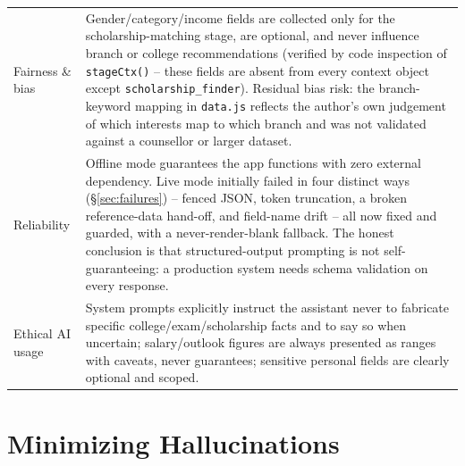 \documentclass[11pt]{article}
\begin{document}
\begin{longtable}{|p{2.6cm}|p{11cm}|}
Fairness \& bias & Gender/category/income fields are collected only for the scholarship-matching stage, are optional, and never influence branch or college recommendations (verified by code inspection of \texttt{stageCtx()} -- these fields are absent from every context object except \texttt{scholarship\_finder}). Residual bias risk: the branch-keyword mapping in \texttt{data.js} reflects the author's own judgement of which interests map to which branch and was not validated against a counsellor or larger dataset. \\
Reliability & Offline mode guarantees the app functions with zero external dependency. Live mode initially failed in four distinct ways (\S\ref{sec:failures}) -- fenced JSON, token truncation, a broken reference-data hand-off, and field-name drift -- all now fixed and guarded, with a never-render-blank fallback. The honest conclusion is that structured-output prompting is not self-guaranteeing: a production system needs schema validation on every response. \\
Ethical AI usage & System prompts explicitly instruct the assistant never to fabricate specific college/exam/scholarship facts and to say so when uncertain; salary/outlook figures are always presented as ranges with caveats, never guarantees; sensitive personal fields are clearly optional and scoped. \\
\end{longtable}

\section{Minimizing Hallucinations}
\label{sec:hallucination}
\end{document}
